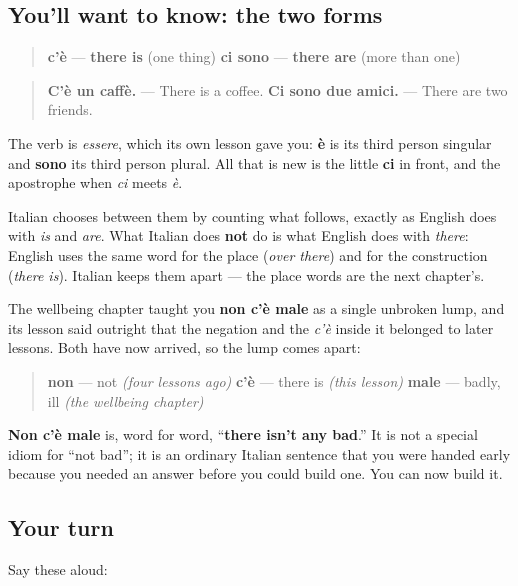 \subsection*{You'll want to know: the two forms}
\begin{quote}
\textbf{c'è} — \textbf{there is} (one thing) \textbf{ci sono} — \textbf{there are} (more than one)
\end{quote}

\begin{quote}
\textbf{C'è un caffè.} — There is a coffee. \textbf{Ci sono due amici.} — There are two friends.
\end{quote}

The verb is \emph{essere}, which its own lesson gave you: \textbf{è} is its third person singular and \textbf{sono} its third person plural. All that is new is the little \textbf{ci} in front, and the apostrophe when \emph{ci} meets \emph{è}.

Italian chooses between them by counting what follows, exactly as English does with \emph{is} and \emph{are}. What Italian does \textbf{not} do is what English does with \emph{there}: English uses the same word for the place (\emph{over there}) and for the construction (\emph{there is}). Italian keeps them apart — the place words are the next chapter's.

\begin{cousinweb}
The wellbeing chapter taught you \textbf{non c'è male} as a single unbroken lump, and its lesson said outright that the negation and the \emph{c'è} inside it belonged to later lessons. Both have now arrived, so the lump comes apart:

\begin{quote}
\textbf{non} — not \emph{(four lessons ago)} \textbf{c'è} — there is \emph{(this lesson)} \textbf{male} — badly, ill \emph{(the wellbeing chapter)}
\end{quote}

\textbf{Non c'è male} is, word for word, \textquotedblleft{}\textbf{there isn't any bad}.\textquotedblright{} It is not a special idiom for \textquotedblleft{}not bad\textquotedblright{}; it is an ordinary Italian sentence that you were handed early because you needed an answer before you could build one. You can now build it.
\end{cousinweb}

\subsection*{Your turn}
Say these aloud:

